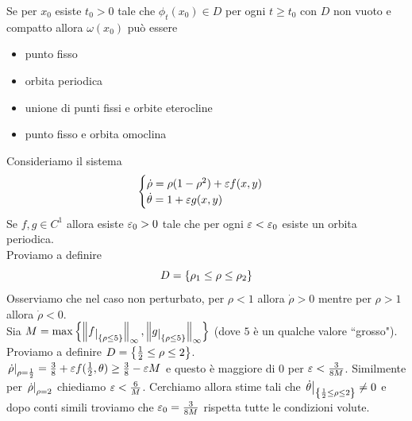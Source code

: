 \begin{fact}
Se per $x_0$ esiste $t_0>0$ tale che $\phi_t(x_0)\in D$ per ogni $t\geq t_0$ con $D$ non vuoto e compatto allora $\omega(x_0)$ pu\`o essere
\begin{itemize}
\item punto fisso
\item orbita periodica
\item unione di punti fissi e orbite eterocline
\item punto fisso e orbita omoclina
\end{itemize}
\end{fact}

\begin{example}
Consideriamo il sistema
\[\begin{cases}
\dot \rho=\rho(1-\rho^2) + \varepsilon f(x,y)\\
\dot \theta=1+\varepsilon g(x,y)
\end{cases}\]
Se $f,g\in C^1$ allora esiste $\varepsilon_0>0$ tale che per ogni $\varepsilon<\varepsilon_0$ esiste un orbita periodica.\\
Proviamo a definire
\[D=\left\{{\rho_1\leq\rho\leq\rho_2}\right\}\]
Osserviamo che nel caso non perturbato, per $\rho<1$ allora $\dot \rho>0$ mentre per $\rho>1$ allora $\dot \rho<0$.\\
Sia $M=\max\cpa{\norm {f\res{\cpa{\rho\leq 5}}}_\infty, \norm {g\res{\cpa{\rho\leq 5}}}_\infty}$ (dove $5$ \`e un qualche valore ``grosso"). Proviamo a definire $D=\left\{{\frac12\leq \rho\leq 2}\right\}$.\\
$\left.{\dot \rho}\right|_{\rho=\frac12}=\frac38+\varepsilon f(\frac12,\theta)\geq \frac38-\varepsilon M$ e questo \`e maggiore di $0$ per $\varepsilon<\frac3{8M}$.
Similmente per $\left.{\dot \rho}\right|_{\rho=2}$ chiediamo $\varepsilon<\frac6M$. Cerchiamo allora stime tali che
$\left.{\dot \theta}\right|_{\left\{{\frac12\leq \rho\leq 2}\right\}}\neq 0$ e dopo conti simili troviamo che $\varepsilon_0=\frac3{8M}$ rispetta tutte le condizioni volute.
\end{example}
